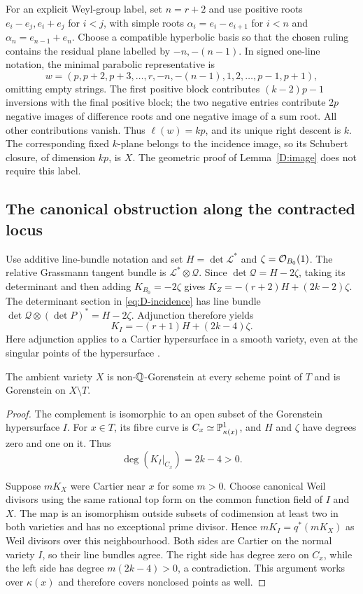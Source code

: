 For an explicit Weyl-group label, set $n=r+2$ and use positive roots $e_i-e_j,e_i+e_j$ for $i<j$, with simple roots $\alpha_i=e_i-e_{i+1}$ for $i<n$ and $\alpha_n=e_{n-1}+e_n$. Choose a compatible hyperbolic basis so that the chosen ruling contains the residual plane labelled by $-n,-(n-1)$. In signed one-line notation, the minimal parabolic representative is
\begin{equation}\label{eq:D-word}
 w=(p,p+2,p+3,\ldots,r,-n,-(n-1),1,2,\ldots,p-1,p+1),
\end{equation}
omitting empty strings. The first positive block contributes $(k-2)p-1$ inversions with the final positive block; the two negative entries contribute $2p$ negative images of difference roots and one negative image of a sum root. All other contributions vanish. Thus $\ell(w)=kp$, and its unique right descent is $k$. The corresponding fixed $k$-plane belongs to the incidence image, so its Schubert closure, of dimension $kp$, is $X$. The geometric proof of Lemma~\ref{D:image} does not require this label.

\subsection{The canonical obstruction along the contracted locus}
Use additive line-bundle notation and set $H=\det\mathcal L^*$ and $\zeta=\mathcal O_{B_0}(1)$. The relative Grassmann tangent bundle is $\mathcal L^*\otimes\mathcal Q$. Since $\det\mathcal Q=H-2\zeta$, taking its determinant and then adding $K_{B_0}=-2\zeta$ gives $K_Z=-(r+2)H+(2k-2)\zeta$. The determinant section in \eqref{eq:D-incidence} has line bundle $\det\mathcal Q\otimes(\det P)^*=H-2\zeta$. Adjunction therefore yields
\[
 K_I=-(r+1)H+(2k-4)\zeta.
\]
Here adjunction applies to a Cartier hypersurface in a smooth variety, even at the singular points of the hypersurface \cite[Chapter~II, Section~8]{Har77}\cite[Chapter~3]{BH93}.

\begin{proposition}\label{D:nonQ}
The ambient variety $X$ is non-$\mathbb Q$-Gorenstein at every scheme point of $T$ and is Gorenstein on $X\setminus T$.
\end{proposition}
\begin{proof}
The complement is isomorphic to an open subset of the Gorenstein hypersurface $I$. For $x\in T$, its fibre curve is $C_x\simeq\mathbb P^1_{\kappa(x)}$, and $H$ and $\zeta$ have degrees zero and one on it. Thus
\[
 \deg(K_I|_{C_x})=2k-4>0.
\]

Suppose $mK_X$ were Cartier near $x$ for some $m>0$. Choose canonical Weil divisors using the same rational top form on the common function field of $I$ and $X$. The map is an isomorphism outside subsets of codimension at least two in both varieties and has no exceptional prime divisor. Hence $mK_I=q^*(mK_X)$ as Weil divisors over this neighbourhood. Both sides are Cartier on the normal variety $I$, so their line bundles agree. The right side has degree zero on $C_x$, while the left side has degree $m(2k-4)>0$, a contradiction. This argument works over $\kappa(x)$ and therefore covers nonclosed points as well.
\end{proof}

